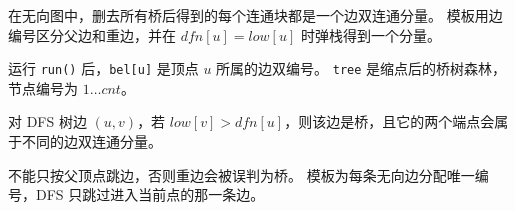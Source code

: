 在无向图中，删去所有桥后得到的每个连通块都是一个边双连通分量。
模板用边编号区分父边和重边，并在 \(dfn[u]=low[u]\) 时弹栈得到一个分量。

运行 \texttt{run()} 后，\texttt{bel[u]} 是顶点 \(u\) 所属的边双编号。
\texttt{tree} 是缩点后的桥树森林，节点编号为 \(1\ldots cnt\)。

\begin{icpcresult}[桥的判定]
  对 DFS 树边 \((u,v)\)，若 \(low[v]>dfn[u]\)，则该边是桥，且它的两个端点会属于不同的边双连通分量。
\end{icpcresult}

\begin{icpcwarning}[无向边编号]
  不能只按父顶点跳边，否则重边会被误判为桥。
  模板为每条无向边分配唯一编号，DFS 只跳过进入当前点的那一条边。
\end{icpcwarning}
